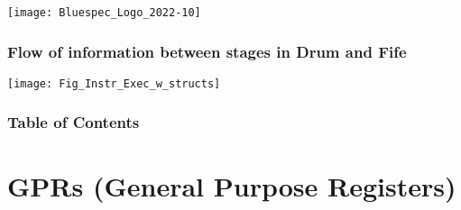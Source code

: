 



\date{L8: RISC-V: GPRs and CSRs}





\begin{frame}
 \titlepage

 \begin{center}
  \texttt{[image: Bluespec\_Logo\_2022-10]}
 \end{center}

\end{frame}





\begin{frame}
\frametitle{Flow of information between stages in Drum and Fife}

\footnotesize

\begin{center}
\texttt{[image: Fig\_Instr\_Exec\_w\_structs]}
\end{center}

\end{frame}


\begin{frame}
\frametitle{Table of Contents}

\tableofcontents

\end{frame}


\section{GPRs (General Purpose Registers)}


